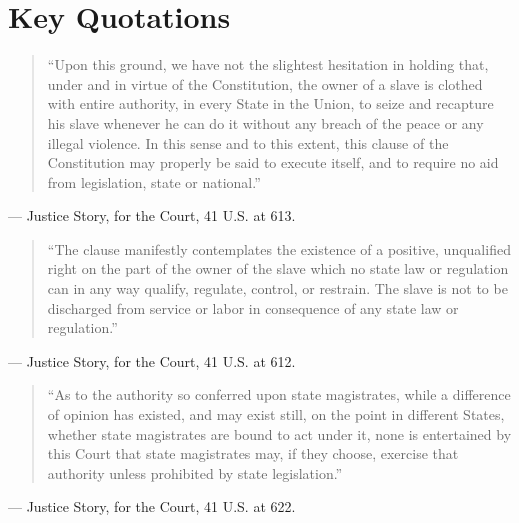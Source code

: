 \documentclass[12pt]{article}
\begin{document}
\section{Key Quotations}

\begin{quote}
``Upon this ground, we have not the slightest hesitation in holding that, under and in virtue of the Constitution, the owner of a slave is clothed with entire authority, in every State in the Union, to seize and recapture his slave whenever he can do it without any breach of the peace or any illegal violence. In this sense and to this extent, this clause of the Constitution may properly be said to execute itself, and to require no aid from legislation, state or national.''
\end{quote}
\noindent --- Justice Story, for the Court, 41 U.S. at 613.

\begin{quote}
``The clause manifestly contemplates the existence of a positive, unqualified right on the part of the owner of the slave which no state law or regulation can in any way qualify, regulate, control, or restrain. The slave is not to be discharged from service or labor in consequence of any state law or regulation.''
\end{quote}
\noindent --- Justice Story, for the Court, 41 U.S. at 612.

\begin{quote}
``As to the authority so conferred upon state magistrates, while a difference of opinion has existed, and may exist still, on the point in different States, whether state magistrates are bound to act under it, none is entertained by this Court that state magistrates may, if they choose, exercise that authority unless prohibited by state legislation.''
\end{quote}
\noindent --- Justice Story, for the Court, 41 U.S. at 622.
\end{document}
